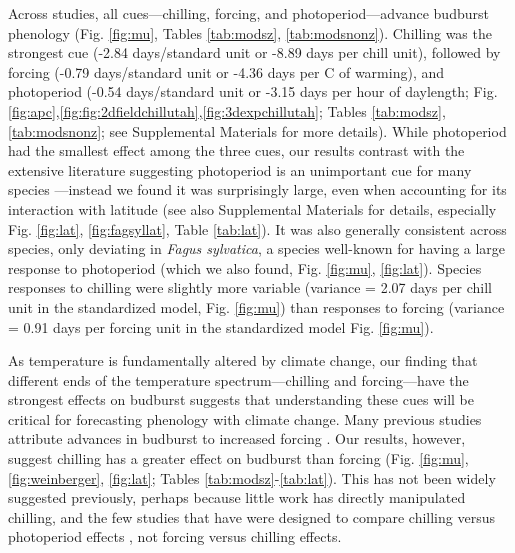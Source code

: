 \documentclass{article}
\begin{document}
\par Across studies, all cues---chilling, forcing, and photoperiod---advance budburst phenology (Fig. \ref{fig:mu}, Tables \ref{tab:modsz}, \ref{tab:modsnonz}). Chilling was the strongest cue (-2.84 days/standard unit or -8.89 days per chill unit), followed by forcing (-0.79 days/standard unit or -4.36 days per \degree C of warming), and photoperiod (-0.54 days/standard unit or -3.15 days per hour of daylength; Fig. \ref{fig:apc},\ref{fig:fig:2dfieldchillutah},\ref{fig:3dexpchillutah}; Tables \ref{tab:modsz},\ref{tab:modsnonz}; see Supplemental Materials for more details). While photoperiod had the smallest effect among the three cues, our results contrast with the extensive literature suggesting photoperiod is an unimportant cue for many species \citep{zohner2016,koerner2010a}---instead we found it was surprisingly large, even when accounting for its interaction with latitude (see also Supplemental Materials for details, especially Fig. \ref{fig:lat}, \ref{fig:fagsyllat}, Table \ref{tab:lat}). It was also generally consistent across species, only deviating in \emph{Fagus sylvatica}, a species well-known for having a large response to photoperiod (which we also found, Fig. \ref{fig:mu}, \ref{fig:lat}). Species responses to chilling were slightly more variable (variance = 2.07 days per chill unit in the standardized model, Fig. \ref{fig:mu}) than responses to forcing (variance = 0.91 days per forcing unit in the standardized model Fig. \ref{fig:mu}).
\par As temperature is fundamentally altered by climate change, our finding that different ends of the temperature spectrum---chilling and forcing---have the strongest effects on budburst suggests that understanding these cues will be critical for forecasting phenology with climate change. Many previous studies attribute advances in budburst to increased forcing \citep{Basler:2014aa,bradley1999,menzel2006,harrington2015}.
Our results, however, suggest chilling has a greater effect on budburst than forcing (Fig. \ref{fig:mu}, \ref{fig:weinberger}, \ref{fig:lat}; Tables \ref{tab:modsz}-\ref{tab:lat}). This has not been widely suggested previously, perhaps because little work has directly manipulated chilling, and the few studies that have were designed to compare chilling versus photoperiod effects \citep[e.g., ][]{Basler:2014aa,Caffarra:2011qf,Laube:2014a,zohner2016}, not forcing versus chilling effects. 
\end{document}
